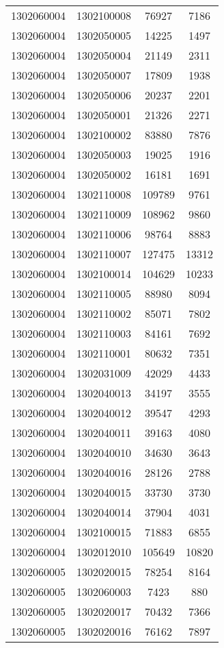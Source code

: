 \begin{longtable}[h]{llcc}
		1302060004 & 1302100008 & 76927 & 7186\\
		1302060004 & 1302050005 & 14225 & 1497\\
		1302060004 & 1302050004 & 21149 & 2311\\
		1302060004 & 1302050007 & 17809 & 1938\\
		1302060004 & 1302050006 & 20237 & 2201\\
		1302060004 & 1302050001 & 21326 & 2271\\
		1302060004 & 1302100002 & 83880 & 7876\\
		1302060004 & 1302050003 & 19025 & 1916\\
		1302060004 & 1302050002 & 16181 & 1691\\
		1302060004 & 1302110008 & 109789 & 9761\\
		1302060004 & 1302110009 & 108962 & 9860\\
		1302060004 & 1302110006 & 98764 & 8883\\
		1302060004 & 1302110007 & 127475 & 13312\\
		1302060004 & 1302100014 & 104629 & 10233\\
		1302060004 & 1302110005 & 88980 & 8094\\
		1302060004 & 1302110002 & 85071 & 7802\\
		1302060004 & 1302110003 & 84161 & 7692\\
		1302060004 & 1302110001 & 80632 & 7351\\
		1302060004 & 1302031009 & 42029 & 4433\\
		1302060004 & 1302040013 & 34197 & 3555\\
		1302060004 & 1302040012 & 39547 & 4293\\
		1302060004 & 1302040011 & 39163 & 4080\\
		1302060004 & 1302040010 & 34630 & 3643\\
		1302060004 & 1302040016 & 28126 & 2788\\
		1302060004 & 1302040015 & 33730 & 3730\\
		1302060004 & 1302040014 & 37904 & 4031\\
		1302060004 & 1302100015 & 71883 & 6855\\
		1302060004 & 1302012010 & 105649 & 10820\\
		1302060005 & 1302020015 & 78254 & 8164\\
		1302060005 & 1302060003 & 7423 & 880\\
		1302060005 & 1302020017 & 70432 & 7366\\
		1302060005 & 1302020016 & 76162 & 7897\\

\end{longtable}
